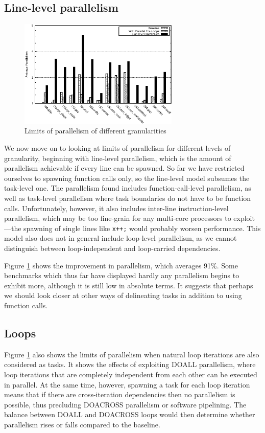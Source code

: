 \subsection{Line-level parallelism}

\begin{figure}
 \centering
 \includegraphics[width=3in]{spec-gran}
 \caption{Limits of parallelism of different granularities}
 \label{spec-gran}
\end{figure}

We now move on to looking at limits of parallelism for different levels of granularity, beginning with line-level parallelism, which is the amount of parallelism achievable if every line can be spawned.
So far we have restricted ourselves to spawning function calls only, so the line-level model subsumes the task-level one.
The parallelism found includes function-call-level parallelism, as well as task-level parallelism where task boundaries do not have to be function calls.
Unfortunately, however, it also includes inter-line instruction-level parallelism, which may be too fine-grain for any multi-core processors to exploit---the spawning of single lines like \texttt{x++;} would probably worsen performance.
This model also does not in general include loop-level parallelism, as we cannot distinguish between loop-independent and loop-carried dependencies.

Figure \ref{spec-gran} shows the improvement in parallelism, which averages 91\%.
Some benchmarks which thus far have displayed hardly any parallelism begins to exhibit more, although it is still low in absolute terms.
It suggests that perhaps we should look closer at other ways of delineating tasks in addition to using function calls.

\subsection{Loops}

Figure \ref{spec-gran} also shows the limits of parallelism when natural loop iterations are also considered as tasks.
It shows the effects of exploiting DOALL parallelism, where loop iterations that are completely independent from each other can be executed in parallel.
At the same time, however, spawning a task for each loop iteration means that if there are cross-iteration dependencies then no parallelism is possible, thus precluding DOACROSS parallelism or software pipelining.
The balance between DOALL and DOACROSS loops would then determine whether parallelism rises or falls compared to the baseline.

